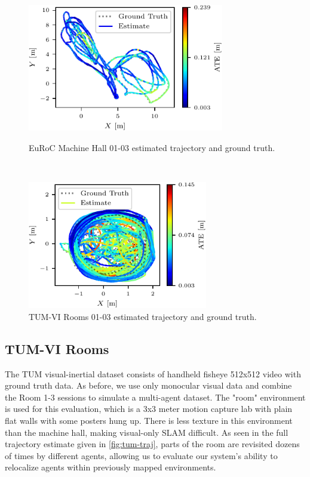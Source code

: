 \begin{figure}[h]
    \centering
    \captionsetup{format=plain}
    \begin{minipage}{0.45\linewidth}
        \centering
        \includegraphics[height=2.2in]{figures/apr11_mh_trajectory_b_trajectory.pdf}
        \caption{EuRoC Machine Hall 01-03 estimated trajectory and ground truth.}
        \label{fig:euroc-traj}
    \end{minipage}\hfill%
    ~
    \begin{minipage}{0.45\linewidth}
        \centering
        \includegraphics[height=2.2in]{figures/apr11_tum_room_trajectory_a_trajectory.pdf}
        \caption{TUM-VI Rooms 01-03 estimated trajectory and ground truth.}
        \label{fig:tum-traj}
    \end{minipage}
\end{figure}


\subsection{TUM-VI Rooms}
\label{sec:tum-rooms}
The TUM visual-inertial dataset \autocite{8593419} consists of handheld fisheye 512x512 video with ground truth data. As before, we use only monocular visual data and combine the Room 1-3 sessions to simulate a multi-agent dataset. The "room" environment is used for this evaluation, which is a 3x3 meter motion capture lab with plain flat walls with some posters hung up. There is less texture in this environment than the machine hall, making visual-only SLAM difficult. As seen in the full trajectory estimate given in \autoref{fig:tum-traj}, parts of the room are revisited dozens of times by different agents, allowing us to evaluate our system's ability to relocalize agents within previously mapped environments.

